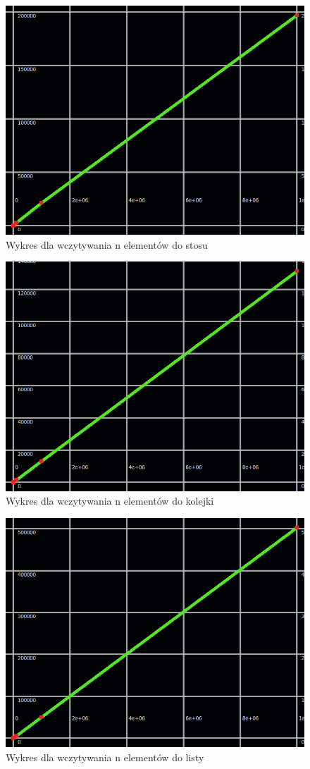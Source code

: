 \documentclass[a4paper,10pt]{scrartcl}
\begin{document}
\begin{figure}
 \centering
  \includegraphics[scale=0.4]{ret_data2}
 \caption{Wykres dla wczytywania n elementów do stosu}
\end{figure}

\begin{figure}
 \centering
  \includegraphics[scale=0.4]{ret_data3}
 \caption{Wykres dla wczytywania n elementów do kolejki}
\end{figure}

\begin{figure}
 \centering
  \includegraphics[scale=0.4]{ret_data4}
 \caption{Wykres dla wczytywania n elementów do listy}
\end{figure}
\end{document}
